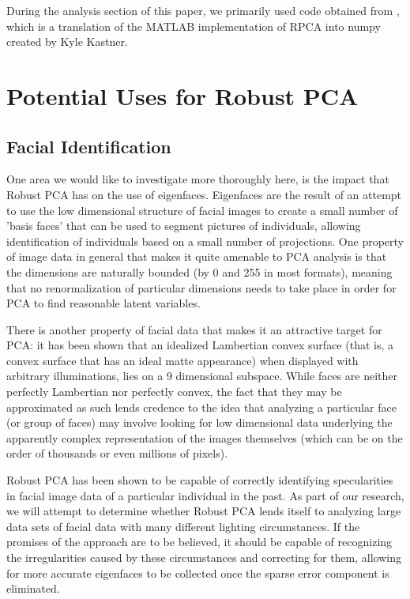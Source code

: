 \documentclass[11pt]{scrartcl} %
\theoremstyle{plain}
\begin{document}
During the analysis section of this paper, we primarily used code obtained from \cite{usedcode}, which is a translation of the MATLAB implementation of RPCA into numpy created by Kyle Kastner.

\section{Potential Uses for Robust PCA}

\subsection{Facial Identification}
One area we would like to investigate more thoroughly here, is the impact that Robust PCA has on the use of eigenfaces. Eigenfaces are the result of an attempt to use the low dimensional structure of facial images to create a small number of 'basis faces' that can be used to segment pictures of individuals, allowing identification of individuals based on a small number of projections. One property of image data in general that makes it quite amenable to PCA analysis is that the dimensions are naturally bounded (by 0 and 255 in most formats), meaning that no renormalization of particular dimensions needs to take place in order for PCA to find reasonable latent variables.

There is another property of facial data that makes it an attractive target for PCA: it has been shown that an idealized Lambertian convex surface (that is, a convex surface that has an ideal matte appearance) when displayed with arbitrary illuminations, lies on a 9 dimensional subspace\cite{lambertian}. While faces are neither perfectly Lambertian nor perfectly convex, the fact that they may be approximated as such lends credence to the idea that analyzing a particular face (or group of faces) may involve looking for low dimensional data underlying the apparently complex representation of the images themselves (which can be on the order of thousands or even millions of pixels).

Robust PCA has been shown to be capable of correctly identifying specularities in facial image data of a particular individual in the past\cite{rpca}. As part of our research, we will attempt to determine whether Robust PCA lends itself to analyzing large data sets of facial data with many different lighting circumstances. If the promises of the approach are to be believed, it should be capable of recognizing the irregularities caused by these circumstances and correcting for them, allowing for more accurate eigenfaces to be collected once the sparse error component is eliminated. 
\end{document}
